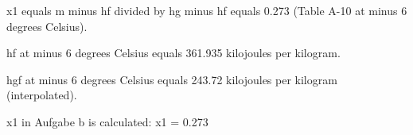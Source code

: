 x1 equals m minus hf divided by hg minus hf equals 0.273 (Table A-10 at minus 6 degrees Celsius).  

hf at minus 6 degrees Celsius equals 361.935 kilojoules per kilogram.  

hgf at minus 6 degrees Celsius equals 243.72 kilojoules per kilogram (interpolated).

x1 in Aufgabe b is calculated:  
x1 = 0.273